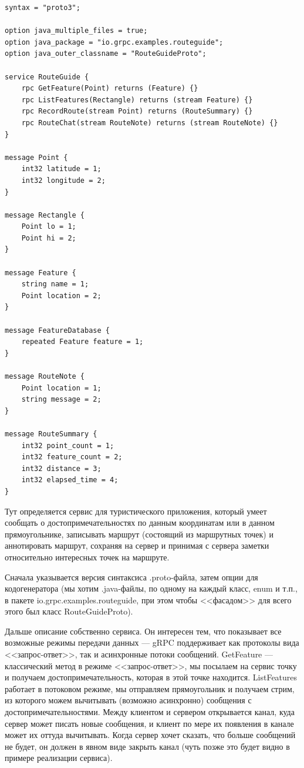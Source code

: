 \documentclass{../../text-style}
\begin{document}
\begin{verbatim}
syntax = "proto3";

option java_multiple_files = true;
option java_package = "io.grpc.examples.routeguide";
option java_outer_classname = "RouteGuideProto";

service RouteGuide {
    rpc GetFeature(Point) returns (Feature) {}
    rpc ListFeatures(Rectangle) returns (stream Feature) {}
    rpc RecordRoute(stream Point) returns (RouteSummary) {}
    rpc RouteChat(stream RouteNote) returns (stream RouteNote) {}
}

message Point {
    int32 latitude = 1;
    int32 longitude = 2;
}

message Rectangle {
    Point lo = 1;
    Point hi = 2;
}

message Feature {
    string name = 1;
    Point location = 2;
}

message FeatureDatabase {
    repeated Feature feature = 1;
}

message RouteNote {
    Point location = 1;
    string message = 2;
}

message RouteSummary {
    int32 point_count = 1;
    int32 feature_count = 2;
    int32 distance = 3;
    int32 elapsed_time = 4;
}
\end{verbatim}

Тут определяется сервис для туристического приложения, который умеет сообщать о достопримечательностях по данным координатам или в данном прямоугольнике, записывать маршрут (состоящий из маршрутных точек) и аннотировать маршрут, сохраняя на сервер и принимая с сервера заметки относительно интересных точек на маршруте. 

Сначала указывается версия синтаксиса .proto-файла, затем опции для кодогенератора (мы хотим .java-файлы, по одному на каждый класс, enum и т.п., в пакете io.grpc.examples.routeguide, при этом чтобы <<фасадом>> для всего этого был класс RouteGuideProto).

Дальше описание собственно сервиса. Он интересен тем, что показывает все возможные режимы передачи данных --- gRPC поддерживает как протоколы вида <<запрос-ответ>>, так и асинхронные потоки сообщений. GetFeature --- классический метод в режиме <<запрос-ответ>>, мы посылаем на сервис точку и получаем достопримечательность, которая в этой точке находится. ListFeatures работает в потоковом режиме, мы отправляем прямоугольник и получаем стрим, из которого можем вычитывать (возможно асинхронно) сообщения с достопримечательностями. Между клиентом и сервером открывается канал, куда сервер может писать новые сообщения, и клиент по мере их появления в канале может их оттуда вычитывать. Когда сервер хочет сказать, что больше сообщений не будет, он должен в явном виде закрыть канал (чуть позже это будет видно в примере реализации сервиса).
\end{document}
